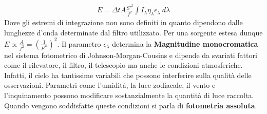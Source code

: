 \documentclass[a4paper, oneside]{book}
\begin{document}
\begin{align}
    E = \Delta t A \frac{S'^{2} }{f^{2}}\int I_\lambda\eta_\lambda\epsilon_\lambda \ d\lambda 
\end{align}
Dove gli estremi di integrazione non sono definiti in quanto dipendono dalle
lunghezze d'onda determinate dal filtro utilizzato. Per una sorgente estesa dunque
$E \propto \frac{A}{f^{2}} = \left(\frac{1}{F^{\#}}\right)^2$.  
Il parametro $\epsilon_\lambda$ determina la \textbf{Magnitudine monocromatica} 
nel sistema fotometrico di Johnson-Morgan-Cousins e dipende da svariati fattori 
come il rilevatore, il filtro, il telescopio ma anche le condizioni atmosferiche. Infatti, il cielo ha tantissime variabili che possono interferire
    sulla qualità delle osservazioni. Parametri come l'umidità, la luce zodiacale,
    il vento e l'inquinamento possono modificare sostanzialmente la quantità di luce raccolta. 
Quando vengono soddisfatte queste condizioni si parla di \textbf{fotometria assoluta}. 
\end{document}
